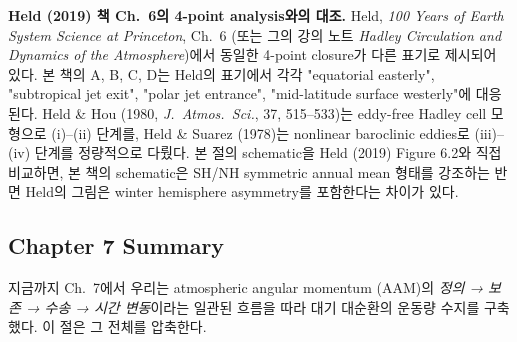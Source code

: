 

\begin{hisublock}
\textbf{Held (2019) 책 Ch.~6의 4-point analysis와의 대조.}
Held, \textit{100 Years of Earth System Science at Princeton}, Ch.~6
(또는 그의 강의 노트 \textit{Hadley Circulation and Dynamics of the
Atmosphere})에서 동일한 4-point closure가 다른 표기로 제시되어 있다.
본 책의 A, B, C, D는 Held의 표기에서 각각 "equatorial easterly", "subtropical
jet exit", "polar jet entrance", "mid-latitude surface westerly"에 대응된다.
Held \& Hou (1980, \textit{J.\ Atmos.\ Sci.}, 37, 515--533)는 eddy-free
Hadley cell 모형으로 (i)--(ii) 단계를, Held \& Suarez (1978)는 nonlinear
baroclinic eddies로 (iii)--(iv) 단계를 정량적으로 다뤘다.  본 절의
schematic을 Held (2019) Figure 6.2와 직접 비교하면, 본 책의 schematic은
SH/NH symmetric annual mean 형태를 강조하는 반면 Held의 그림은 winter
hemisphere asymmetry를 포함한다는 차이가 있다.
\end{hisublock}



\subsection*{Chapter 7 Summary}

지금까지 Ch.~7에서 우리는 atmospheric angular momentum (AAM)의 \emph{정의 →
보존 → 수송 → 시간 변동}이라는 일관된 흐름을 따라 대기 대순환의 운동량
수지를 구축했다.  이 절은 그 전체를 압축한다.


